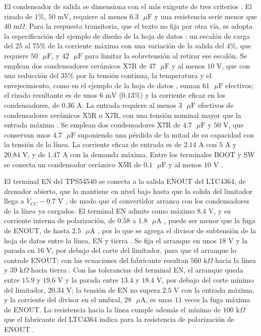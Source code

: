 \documentclass[../../General.tex]{subfiles}
\begin{document}
El condensador de salida se dimensiona con el más exigente de tres criterios \citep{ti_tps54540}. El rizado de $1\%$, $50\text{ mV}$, requiere al menos $6.3\text{ }\mu\text{F}$ y una resistencia serie menor que $40\text{ m}\Omega$. Para la respuesta transitoria, que el texto no fija por otra vía, se adopta la especificación del ejemplo de diseño de la hoja de datos \citep{ti_tps54540}: un escalón de carga del $25$ al $75\%$ de la corriente máxima con una variación de la salida del $4\%$, que requiere $50\text{ }\mu\text{F}$, y $42\text{ }\mu\text{F}$ para limitar la sobretensión al retirar ese escalón. Se emplean dos condensadores cerámicos X7R de $47\text{ }\mu\text{F}$ y al menos $10\text{ V}$, que con una reducción del $35\%$ por la tensión continua, la temperatura y el envejecimiento, como en el ejemplo de la hoja de datos \citep{ti_tps54540}, suman $61\text{ }\mu\text{F}$ efectivos; el rizado resultante es de unos $6\text{ mV}$ ($0.13\%$) y la corriente eficaz en los condensadores, de $0.36\text{ A}$.
La entrada requiere al menos $3\text{ }\mu\text{F}$ efectivos de condensadores cerámicos X5R o X7R, con una tensión nominal mayor que la entrada máxima \citep{ti_tps54540}. Se emplean dos condensadores X7R de $4.7\text{ }\mu\text{F}$ y $50\text{ V}$, que conservan unos $4.7\text{ }\mu\text{F}$ suponiendo una pérdida de la mitad de su capacidad con la tensión de la línea. La corriente eficaz de entrada es de $2.14\text{ A}$ con $5\text{ A}$ y $20.84\text{ V}$, y de $1.47\text{ A}$ con la demanda máxima. Entre los terminales BOOT y SW se conecta un condensador cerámico X5R de $0.1\text{ }\mu\text{F}$ y al menos $10\text{ V}$ \citep{ti_tps54540}.

El terminal EN del TPS54540 se conecta a la salida ENOUT del LTC4364, de drenador abierto, que lo mantiene en nivel bajo hasta que la salida del limitador llega a $V_{CC} - 0.7\text{ V}$ \citep{adi_ltc4364}, de modo que el convertidor arranca con los condensadores de la línea ya cargados. El terminal EN admite como máximo $8.4\text{ V}$, y su corriente interna de polarización, de $0.58$ a $1.8\text{ }\mu\text{A}$ \citep{ti_tps54540}, puede ser menor que la fuga de ENOUT, de hasta $2.5\text{ }\mu\text{A}$ \citep{adi_ltc4364}, por lo que se agrega el divisor de subtensión de la hoja de datos entre la línea, EN y tierra \citep{ti_tps54540}. Se fija el arranque en unos $18\text{ V}$ y la parada en $16\text{ V}$, por debajo del corte del limitador, para que el arranque lo controle ENOUT; con las ecuaciones del fabricante resultan $560\text{ k}\Omega$ hacia la línea y $39\text{ k}\Omega$ hacia tierra \citep{ti_tps54540}. Con las tolerancias del terminal EN, el arranque queda entre $15.9$ y $19.6\text{ V}$ y la parada entre $13.4$ y $18.4\text{ V}$, por debajo del corte mínimo del limitador, $20.34\text{ V}$; la tensión de EN no supera $2.5\text{ V}$ con la entrada máxima, y la corriente del divisor en el umbral, $28\text{ }\mu\text{A}$, es unas $11$ veces la fuga máxima de ENOUT. La resistencia hacia la línea cumple además el mínimo de $100\text{ k}\Omega$ que el fabricante del LTC4364 indica para la resistencia de polarización de ENOUT \citep{adi_ltc4364}.
\end{document}
